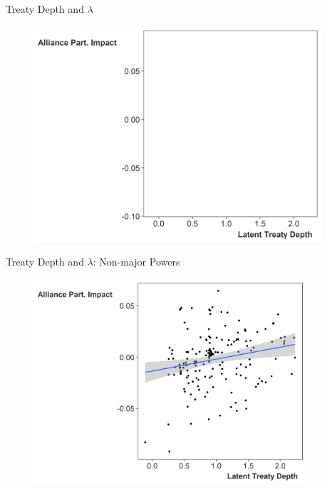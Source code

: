 \documentclass[12pt]{beamer}
\begin{document}
\begin{frame}{Treaty Depth and $\lambda$}

\begin{figure}[htbp]
	\centering
		\includegraphics[width=0.95\textwidth]{ld-lambda-blank.png}
	\label{fig:ld-lambda-blank}
\end{figure}


\end{frame}



\begin{frame}{Treaty Depth and $\lambda$: Non-major Powers}

\begin{figure}
	\centering
		\includegraphics[width=0.9\textwidth]{ld-lambda-min.png}
	\label{fig:ld-lambda-min}
\end{figure}


\end{frame}
\end{document}
